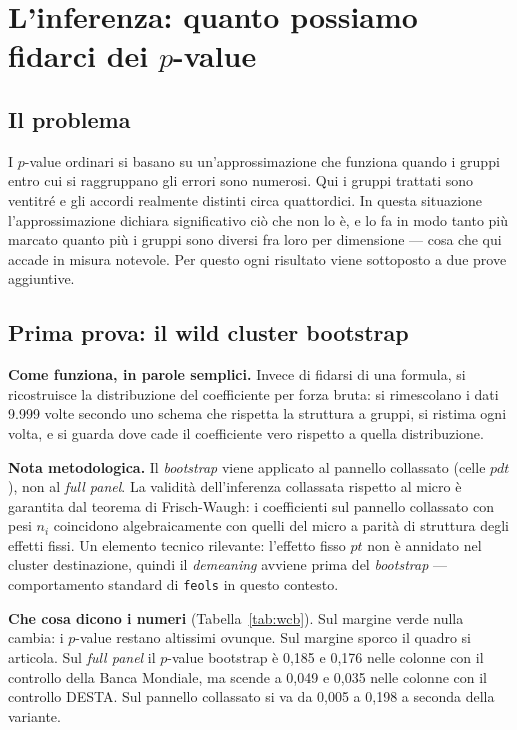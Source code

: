 \documentclass[11pt,a4paper]{article}
\begin{document}


\clearpage
\section{L'inferenza: quanto possiamo fidarci dei \texorpdfstring{$p$}{p}-value}

\subsection{Il problema}

I $p$-value ordinari si basano su un'approssimazione che funziona quando i gruppi entro
cui si raggruppano gli errori sono numerosi. Qui i gruppi trattati sono ventitr\'e e gli
accordi realmente distinti circa quattordici. In questa situazione l'approssimazione
dichiara significativo ci\`o che non lo \`e, e lo fa in modo tanto pi\`u marcato quanto
pi\`u i gruppi sono diversi fra loro per dimensione --- cosa che qui accade in misura
notevole. Per questo ogni risultato viene sottoposto a due prove aggiuntive.

\subsection{Prima prova: il wild cluster bootstrap}

\textbf{Come funziona, in parole semplici.} Invece di fidarsi di una formula, si ricostruisce
la distribuzione del coefficiente per forza bruta: si rimescolano i dati 9.999 volte
secondo uno schema che rispetta la struttura a gruppi, si ristima ogni volta, e si guarda
dove cade il coefficiente vero rispetto a quella distribuzione.

\textbf{Nota metodologica.} Il \emph{bootstrap} viene applicato al pannello collassato
(celle $pdt$), non al \emph{full panel}. La validit\`a dell'inferenza collassata rispetto
al micro \`e garantita dal teorema di Frisch-Waugh: i coefficienti sul pannello collassato
con pesi $n_i$ coincidono algebraicamente con quelli del micro a parit\`a di struttura degli
effetti fissi. Un elemento tecnico rilevante: l'effetto fisso $pt$ non \`e annidato nel
cluster destinazione, quindi il \emph{demeaning} avviene prima del \emph{bootstrap} ---
comportamento standard di \texttt{feols} in questo contesto.

\textbf{Che cosa dicono i numeri} (Tabella~\ref{tab:wcb}). Sul margine verde nulla cambia:
i $p$-value restano altissimi ovunque. Sul margine sporco il quadro si articola. Sul
\emph{full panel} il $p$-value bootstrap \`e 0,185 e 0,176 nelle colonne con il controllo
della Banca Mondiale, ma scende a 0,049 e 0,035 nelle colonne con il controllo DESTA. Sul
pannello collassato si va da 0,005 a 0,198 a seconda della variante.
\end{document}
